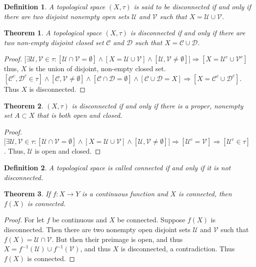 \documentclass[12pt,oneside]{book}
\theoremstyle{mystyle}
\newtheorem{theorem}{Theorem}[section]
\newtheorem{definition}{Definition}[section]
\begin{document}
\begin{definition}
A topological space $(X,\tau)$ is said to be disconnected if and only if there are two disjoint nonempty open sets $\mathcal{U}$ and $\mathcal{V}$ such that $X = \mathcal{U}\cup \mathcal{V}$.
\end{definition}

\begin{theorem}
A topological space $(X,\tau)$ is disconnected if and only if there are two non-empty disjoint closed set $\mathcal{C}$ and $\mathcal{D}$ such that $X=\mathcal{C}\cup\mathcal{D}$.
\end{theorem}
\begin{proof}
$\big[\exists \mathcal{U},\mathcal{V}\in \tau: [\mathcal{U}\cap \mathcal{V}=\emptyset]\land [X=\mathcal{U}\cup \mathcal{V}]\land [\mathcal{U},\mathcal{V}\ne \emptyset]\big]\Rightarrow [X = \mathcal{U}^c\cup \mathcal{V}^c]$ thus, $X$ is the union of disjoint, non-empty closed set. $[\mathcal{C}^c,\mathcal{D}^c\in \tau]\land[\mathcal{C},\mathcal{V}\ne\emptyset]\land[\mathcal{C}\cap \mathcal{D}=\emptyset]\land[\mathcal{C}\cup\mathcal{D}=X]\Rightarrow [X=\mathcal{C}^c\cup\mathcal{D}^c].$ Thus $X$ is disconnected.
\end{proof}

\begin{theorem}
$(X,\tau)$ is disconnected if and only if there is a proper, nonempty set $A\subset X$ that is both open and closed.
\end{theorem}
\begin{proof}
$\big[\exists \mathcal{U},\mathcal{V}\in \tau:[\mathcal{U}\cap \mathcal{V}=\emptyset]\land [X=\mathcal{U}\cup\mathcal{V}]\land[\mathcal{U},\mathcal{V}\ne \emptyset]\big]\Rightarrow [\mathcal{U}^c = \mathcal{V}]\Rightarrow [\mathcal{U}^c\in \tau]$. Thus, $\mathcal{U}$ is open and closed.
\end{proof}

\begin{definition}
A topological space is called connected if and only if it is not disconnected.
\end{definition}

\begin{theorem}
If $f:X\rightarrow Y$ is a continuous function and $X$ is connected, then $f(X)$ is connected.
\end{theorem}
\begin{proof}
For let $f$ be continuous and $X$ be connected. Suppose $f(X)$ is disconnected. Then there are two nonempty open disjoint sets $\mathcal{U}$ and $\mathcal{V}$ such that $f(X) = \mathcal{U}\cap \mathcal{V}$. But then their preimage is open, and thus $X=f^{-1}(\mathcal{U})\cup f^{-1}(\mathcal{V})$, and thus $X$ is disconnected, a contradiction. Thus $f(X)$ is connected.
\end{proof}
\end{document}

